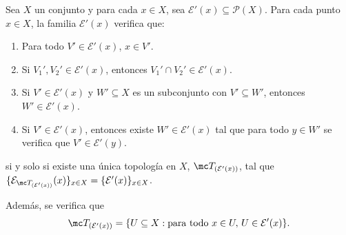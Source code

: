 \begin{teo}
    Sea \(X\) un conjunto y para cada \(x \in X\), sea \(\mathcal{E}'(x) \subseteq \mathcal{P}(X)\). Para cada punto \(x \in X\), la familia \(\mathcal{E}'(x)\) verifica que:
    \begin{enumerate}
        \item Para todo \(V' \in \mathcal{E}'(x)\), \(x \in V'\).
        \item Si \(V_1', V_2' \in \mathcal{E}'(x)\), entonces \(V_1' \cap V_2' \in \mathcal{E}'(x)\).
        \item Si \(V' \in \mathcal{E}'(x)\) y \(W' \subseteq X\) es un subconjunto con \(V' \subseteq W'\), entonces \(W' \in \mathcal{E}'(x)\).
        \item Si \(V' \in \mathcal{E}'(x)\), entonces existe \(W' \in \mathcal{E}'(x)\) tal que para todo \(y \in W'\) se verifica que \(V' \in \mathcal{E}'(y)\).
    \end{enumerate}
    si y solo si existe una única topología en \(X\), \(\mc T_{(\mathcal{E}'(x))}\), tal que \(\{\mathcal{E}_{\mc T_{(\mathcal{E}'(x))}}(x)\}_{x \in X} = \{\mathcal{E}'(x)\}_{x \in X}\).
    
    Además, se verifica que
    \[
        \mc T_{(\mathcal{E}'(x))} = \{ U \subseteq X : \text{para todo } x \in U, \, U \in \mathcal{E}'(x) \}.
    \]
\end{teo}

